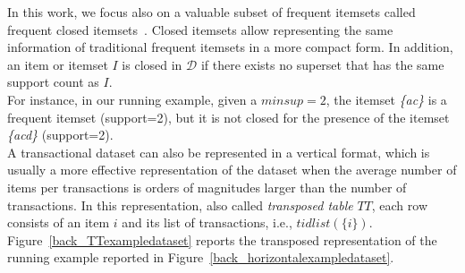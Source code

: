 In this work, we focus also on a valuable subset of frequent itemsets called
frequent closed itemsets~\cite{Zaki_Carpenter}. Closed itemsets
allow representing the same information of traditional frequent itemsets in a
more compact form.
In addition, an item or itemset $I$ is closed in  $\mathcal{D}$ if there exists no superset that
has the same support count as  $I$.\\
For instance, in our running example, given a $minsup=2$, the itemset \textit{\{ac\}} is a frequent itemset (support=2), but it is not closed for the presence of the itemset \textit{\{acd\}} (support=2). 
\\
A transactional dataset can also be represented in a vertical format, which is
usually a more effective representation of the dataset when the average number
of items per transactions is orders of magnitudes larger than the number of
transactions.
In this representation, also called \textit{transposed table} $TT$, each
row consists of an item $i$ and its list of transactions, i.e.,
$tidlist(\{i\})$.
Figure~\ref{back_TTexampledataset} reports the transposed representation of the
running example reported in Figure~\ref{back_horizontalexampledataset}.




